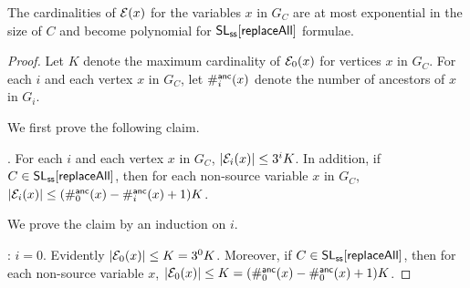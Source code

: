 \begin{proposition}
The cardinalities of $\mathcal{E}(x)$ for the variables $x$ in $G_C$ are at most exponential  in the size of $C$ and become polynomial for $\mathsf{SL}_{\sf ss}[\mathsf{replaceAll}]$ formulae.
\end{proposition}

\begin{proof}
%
Let $K$ denote the maximum cardinality of $\mathcal{E}_0(x)$ for vertices $x$ in $G_C$.
For each $i$ and each vertex $x$ in $G_C$, let  $\#^{\sf anc}_i(x)$ denote the number of ancestors of $x$ in $G_i$.




We first prove the following claim.

\smallskip

. For each $i$ and each vertex $x$ in $G_C$,
$|\mathcal{E}_i(x)| \le 3^i K$. In addition, if $C \in \mathsf{SL}_{\sf ss}[\mathsf{replaceAll}]$, then for each non-source variable $x$ in $G_C$, $|\mathcal{E}_i(x)| \le (\#^{\sf anc}_0(x)-\#^{\sf anc}_i(x)+1) K$.

\smallskip

We prove the claim by an induction on $i$.

\smallskip


: $i=0$. Evidently $|\mathcal{E}_0(x)| \le K = 3^0 K$. Moreover, if $C \in \mathsf{SL}_{\sf ss}[\mathsf{replaceAll}]$, then for each non-source variable $x$, $|\mathcal{E}_0(x)| \le K = (\#^{\sf anc}_0(x)-\#^{\sf anc}_0(x)+1) K$.


\end{proof}
